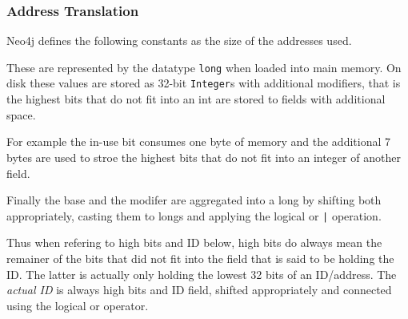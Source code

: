 \documentclass[a4paper,10pt]{article}
\begin{document}
        \subsubsection{Address Translation}
            Neo4j defines the following constants as the size of the addresses used.
            \begin{figure}[htp]\label{addrsize}
            \end{figure}
            These are represented by the datatype \texttt{long} when loaded into main memory. 
            On disk these values are stored as 32-bit \texttt{Integer}s with additional modifiers, that is the highest bits that do not fit into an int are stored to fields with additional space.
            
            For example the in-use bit consumes one byte of memory and the additional 7 bytes are used to stroe the highest bits that do not fit into an integer of another field.
            
            Finally the base and the modifer are aggregated into a long by shifting both appropriately, casting them to longs and applying the logical or \texttt{|} operation.
            
            Thus when refering to high bits and ID below, high bits do always mean the remainer of the bits that did not fit into the field that is said to be holding the ID\@.
            The latter is actually only holding the lowest 32 bits of an ID/address. The \textit{actual ID} is always high bits and ID field, shifted appropriately and connected using the logical or operator.
            
\end{document}

